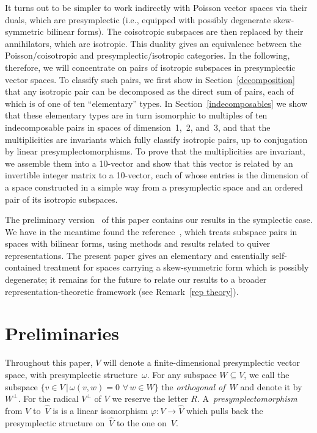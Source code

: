 \documentclass[pdftex]{sigma}
\numberwithin{equation}{section}
\begin{document}
It turns out to be simpler to work indirectly with Poisson vector spaces  via their duals, which are presymplectic (i.e., equipped with   possibly degenerate skew-symmetric bilinear forms).  The coisotropic subspaces are then replaced by their annihilators, which are isotropic.   This duality gives an equivalence between the Poisson/coisotropic and presymplectic/isotropic categories. In the following, therefore, we will concentrate on pairs of isotropic subspaces in presymplectic vector spaces. To classify such pairs, we f\/irst show in Section~\ref{decomposition}  that any isotropic pair can be decomposed as the direct sum of pairs, each of which is of one of ten ``elementary'' types.  In Section~\ref{indecomposables} we show that these elementary types are in turn isomorphic to multiples of ten indecomposable pairs
in spaces of dimension~1,~2, and~3, and that the multiplicities are invariants which fully classify isotropic pairs, up to conjugation by linear presymplectomorphisms. To prove that the multiplicities are invariant, we assemble them into a 10-vector and show that this vector is related by an invertible integer matrix to a 10-vector, each of whose entries is the dimension of  a space constructed in a simple way from a presymplectic space and an ordered pair of its isotropic subspaces.

The preliminary version~\cite{Lorand_Weinstein} of this paper contains our results in the symplectic case. We have in the meantime found the reference~\cite{Sergeichuk}, which treats subspace pairs in spaces with bilinear forms, using methods and results related to quiver representations. The present paper gives an elementary and essentially self-contained treatment  for spaces carrying a skew-symmetric form which is possibly degenerate; it remains for the future to relate our results to a broader representation-theoretic framework (see Remark~\ref{rep theory}).

\section{Preliminaries}\label{preliminaries}

Throughout this paper, $V$ will denote a f\/inite-dimensional presymplectic vector space, with presymplectic structure~$\omega$. For any subspace $W \subseteq V$, we call the subspace $\{ v \in V \,|\, \omega (v, w) = 0$ $\forall \,w \in W \}$ the \textit{orthogonal of~$W$} and denote it by~$W^{\perp}$.
 For the radical $V^{\perp}$ of $V$ we reserve the letter $R$. A~\textit{presymplectomorphism} from $V$ to~$\hat V$ is
is a linear isomorphism $\varphi\colon   V \rightarrow \hat{V}$  which pulls back the presymplectic structure on~$\hat V$ to the one on~$V$.
\end{document}
